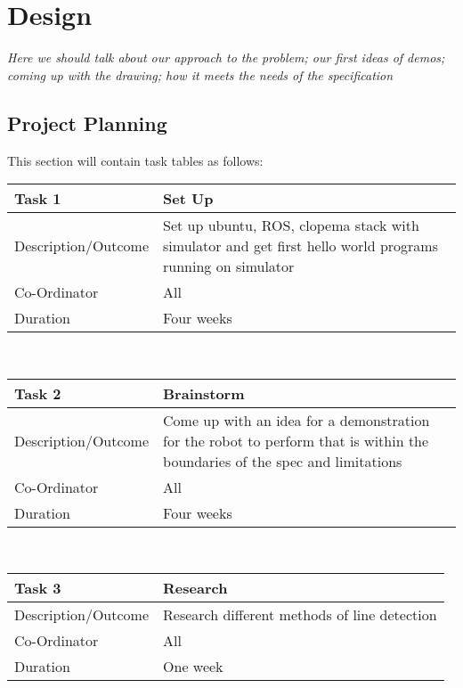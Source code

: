 \documentclass{l3proj}
\begin{document}
\chapter{Design}
\textit{Here we should talk about our approach to the problem; our first ideas of demos; coming up with the drawing; how it meets the needs of the specification}

\section{Project Planning}
This section will contain task tables as follows:
\vspace{2mm}

\begin{tabular}{|p{5cm}|p{9cm}|}
\hline
Task 1 & Set Up\\
\hline
Description/Outcome & Set up ubuntu, ROS, clopema stack with simulator and get first hello world programs running on simulator\\
\hline
Co-Ordinator & All\\
\hline
Duration & Four weeks\\
\hline
\end{tabular}\\

\vspace{2mm}

\begin{tabular}{|p{5cm}|p{9cm}|}
\hline
Task 2 & Brainstorm\\
\hline
Description/Outcome & Come up with an idea for a demonstration for the robot to perform that is within the boundaries of the spec and limitations\\
\hline
Co-Ordinator & All \\
\hline
Duration & Four weeks\\
\hline
\end{tabular}\\

\vspace{2mm}

\begin{tabular}{|p{5cm}|p{9cm}|}
\hline
Task 3 & Research\\
\hline
Description/Outcome & Research different methods of line detection\\
\hline
Co-Ordinator & All\\
\hline
Duration & One week\\
\hline
\end{tabular}\\
\end{document}
